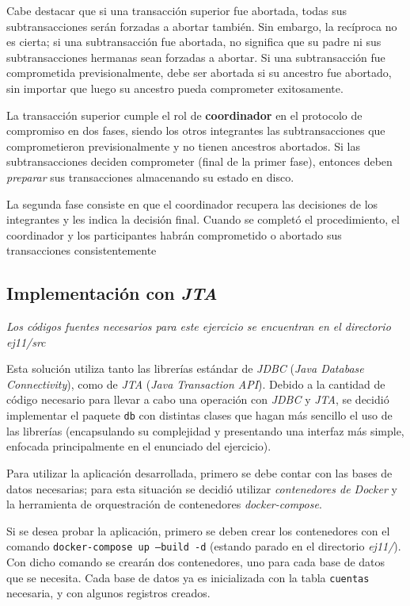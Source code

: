 Cabe destacar que si una transacción superior fue abortada, todas sus subtransacciones serán forzadas a abortar también. Sin embargo, la recíproca no es cierta; si una subtransacción fue abortada, no significa que su padre ni sus subtransacciones hermanas sean forzadas a abortar. Si una subtransacción fue comprometida previsionalmente, debe ser abortada si su ancestro fue abortado, sin importar que luego su ancestro pueda comprometer exitosamente.

La transacción superior cumple el rol de \textbf{coordinador} en el protocolo de compromiso en dos fases, siendo los otros integrantes las subtransacciones que comprometieron previsionalmente y no tienen ancestros abortados. Si las subtransacciones deciden comprometer (final de la primer fase), entonces deben \emph{preparar} sus transacciones almacenando su estado en disco.

La segunda fase consiste en que el coordinador recupera las decisiones de los integrantes y les indica la decisión final. Cuando se completó el procedimiento, el coordinador y los participantes habrán comprometido o abortado sus transacciones consistentemente \autocite{ColourisTwoPhaseCommitProtocol}

\subsection{Implementación con \emph{JTA}}

\emph{Los códigos fuentes necesarios para este ejercicio se encuentran en el directorio \emph{ej11/src}} 

Esta solución utiliza tanto las librerías estándar de \emph{JDBC} (\emph{Java Database Connectivity}), como de \emph{JTA} (\emph{Java Transaction API}). Debido a la cantidad de código  necesario para llevar a cabo una operación con \emph{JDBC} y \emph{JTA}, se decidió implementar el paquete \texttt{db} con distintas clases que hagan más sencillo el uso de las librerías (encapsulando su complejidad y presentando una interfaz más simple, enfocada principalmente en el enunciado del ejercicio).   

Para utilizar la aplicación desarrollada, primero se debe contar con las bases de datos necesarias; para esta situación se decidió utilizar \emph{contenedores de Docker} y la herramienta de orquestración de contenedores \emph{docker-compose}. 

Si se desea probar la aplicación, primero se deben crear los contenedores con el comando \texttt{docker-compose up --build -d} (estando parado en el directorio \emph{ej11/}). Con dicho comando se crearán dos contenedores, uno para cada base de datos que se necesita. Cada base de datos ya es inicializada con la tabla \texttt{cuentas} necesaria, y con algunos registros creados.

